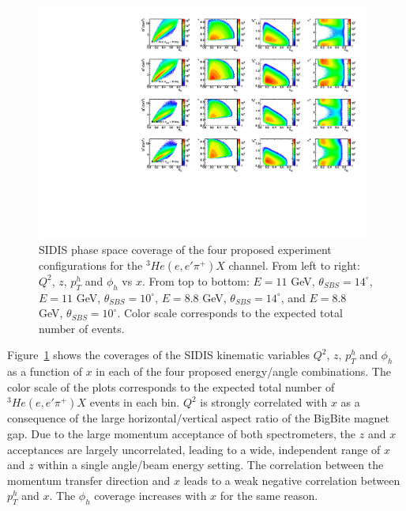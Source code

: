 \begin{figure}[h]
  \begin{center}
    \includegraphics[width=0.98\textwidth]{figures/kine14deg10deg_2Dcomparison.pdf}
  \end{center}
  \caption{\label{kine14_10_2D} SIDIS phase space coverage of the four proposed experiment configurations for the $^3He(e,e'\pi^+)X$ channel. From left to right: $Q^2$, $z$, $p_T^h$ and $\phi_h$ vs $x$. From top to bottom: $E = 11$ GeV, $\theta_{SBS} = 14^\circ$, $E = 11$ GeV, $\theta_{SBS}=10^\circ$, $E = 8.8$ GeV, $\theta_{SBS}=14^\circ$, and $E = 8.8$ GeV, $\theta_{SBS}=10^\circ$. Color scale corresponds to the expected total number of events.}
\end{figure}
Figure~\ref{kine14_10_2D} shows the coverages of the SIDIS kinematic variables $Q^2$, $z$, $p_T^h$ and $\phi_h$ as a function of $x$ in each of the four proposed energy/angle combinations. The color scale of the plots corresponds to the expected total number of $^3He(e,e'\pi^+)X$ events in each bin. $Q^2$ is strongly correlated with $x$ as a consequence of the large horizontal/vertical aspect ratio of the BigBite magnet gap. Due to the large momentum acceptance of both spectrometers, the $z$ and $x$ acceptances are largely uncorrelated, leading to a wide, independent range of $x$ and $z$ within a single angle/beam energy setting. The correlation between the momentum transfer direction and $x$ leads to a weak negative correlation between $p_T^h$ and $x$. The $\phi_h$ coverage increases with $x$ for the same reason.
